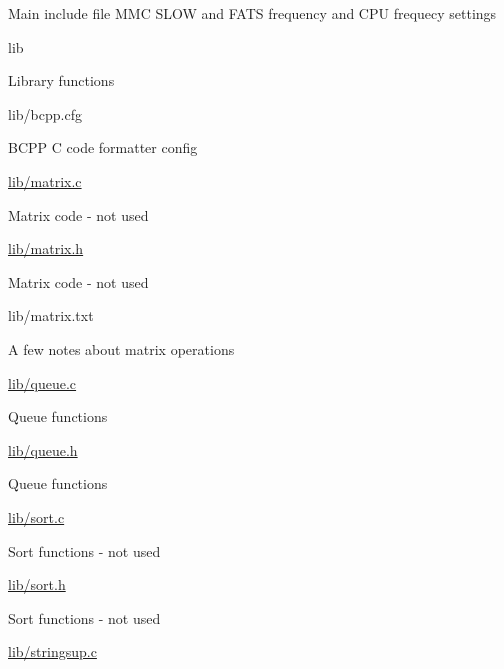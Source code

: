 \begin{DoxyItemize}
\begin{DoxyItemize}
\begin{DoxyItemize}
\item Main include file M\+MC S\+L\+OW and F\+A\+TS frequency and C\+PU frequecy settings
\end{DoxyItemize}
\end{DoxyItemize}
\item lib
\begin{DoxyItemize}
\item Library functions
\item lib/bcpp.\+cfg
\begin{DoxyItemize}
\item B\+C\+PP C code formatter config
\end{DoxyItemize}
\item \hyperlink{matrix_8c}{lib/matrix.\+c}
\begin{DoxyItemize}
\item Matrix code -\/ not used
\end{DoxyItemize}
\item \hyperlink{matrix_8h}{lib/matrix.\+h}
\begin{DoxyItemize}
\item Matrix code -\/ not used
\end{DoxyItemize}
\item lib/matrix.\+txt
\begin{DoxyItemize}
\item A few notes about matrix operations
\end{DoxyItemize}
\item \hyperlink{queue_8c}{lib/queue.\+c}
\begin{DoxyItemize}
\item Queue functions
\end{DoxyItemize}
\item \hyperlink{queue_8h}{lib/queue.\+h}
\begin{DoxyItemize}
\item Queue functions
\end{DoxyItemize}
\item \hyperlink{sort_8c}{lib/sort.\+c}
\begin{DoxyItemize}
\item Sort functions -\/ not used
\end{DoxyItemize}
\item \hyperlink{sort_8h}{lib/sort.\+h}
\begin{DoxyItemize}
\item Sort functions -\/ not used
\end{DoxyItemize}
\item \hyperlink{stringsup_8c}{lib/stringsup.\+c}

\end{DoxyItemize}
\end{DoxyItemize}
